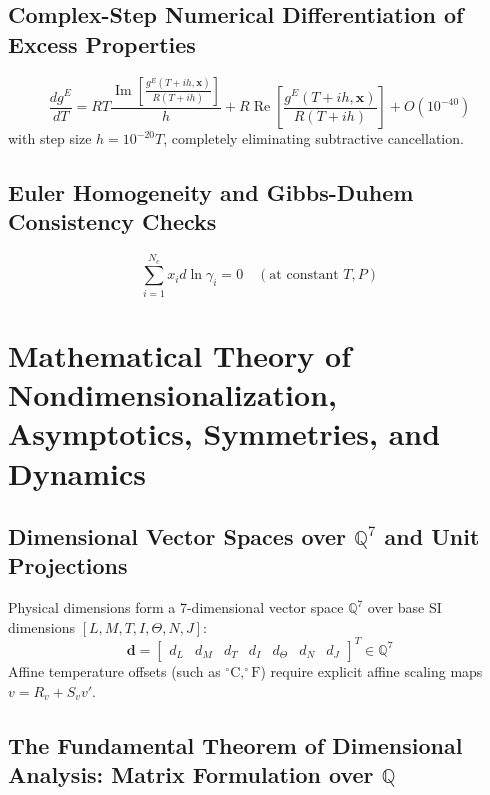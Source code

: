 \documentclass[11pt,a4paper]{article}
\begin{document}
\subsection{Complex-Step Numerical Differentiation of Excess Properties}

\begin{equation}
\frac{dg^E}{dT} = R T \frac{\operatorname{Im}\left[ \frac{g^E(T + i h, \mathbf{x})}{R(T + i h)} \right]}{h} + R \operatorname{Re}\left[ \frac{g^E(T + i h, \mathbf{x})}{R(T + i h)} \right] + O(10^{-40})
\end{equation}
with step size $h = 10^{-20} T$, completely eliminating subtractive cancellation.

\subsection{Euler Homogeneity and Gibbs-Duhem Consistency Checks}

\begin{equation}
\sum_{i=1}^{N_c} x_i d\ln \gamma_i = 0 \quad (\text{at constant } T, P)
\end{equation}

\section{Mathematical Theory of Nondimensionalization, Asymptotics, Symmetries, and Dynamics}

\subsection{Dimensional Vector Spaces over $\mathbb{Q}^7$ and Unit Projections}

Physical dimensions form a 7-dimensional vector space $\mathbb{Q}^7$ over base SI dimensions $[L, M, T, I, \Theta, N, J]$:
\begin{equation}
\mathbf{d} = \begin{bmatrix} d_L & d_M & d_T & d_I & d_\Theta & d_N & d_J \end{bmatrix}^T \in \mathbb{Q}^7
\end{equation}
Affine temperature offsets (such as $^\circ\text{C}, ^\circ\text{F}$) require explicit affine scaling maps $v = R_v + S_v v'$.

\subsection{The Fundamental Theorem of Dimensional Analysis: Matrix Formulation over $\mathbb{Q}$}
\end{document}
